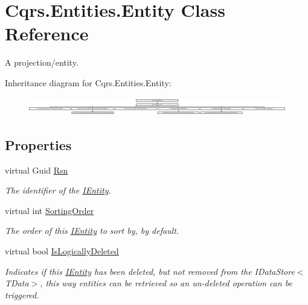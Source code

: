 \hypertarget{classCqrs_1_1Entities_1_1Entity}{}\section{Cqrs.\+Entities.\+Entity Class Reference}
\label{classCqrs_1_1Entities_1_1Entity}


A projection/entity.  


Inheritance diagram for Cqrs.\+Entities.\+Entity\+:\begin{figure}[H]
\begin{center}
\leavevmode
\includegraphics[height=0.801144cm]{classCqrs_1_1Entities_1_1Entity}
\end{center}
\end{figure}
\subsection*{Properties}
\begin{DoxyCompactItemize}
\item 
virtual Guid \hyperlink{classCqrs_1_1Entities_1_1Entity_a5c7605c4ab598f2975b914db7a274796_a5c7605c4ab598f2975b914db7a274796}{Rsn}
\begin{DoxyCompactList}\small\item\em The identifier of the \hyperlink{interfaceCqrs_1_1Entities_1_1IEntity}{I\+Entity}. \end{DoxyCompactList}\item 
virtual int \hyperlink{classCqrs_1_1Entities_1_1Entity_a9913174d2d333a505af68a0f7e5fd2ca_a9913174d2d333a505af68a0f7e5fd2ca}{Sorting\+Order}
\begin{DoxyCompactList}\small\item\em The order of this \hyperlink{interfaceCqrs_1_1Entities_1_1IEntity}{I\+Entity} to sort by, by default. \end{DoxyCompactList}\item 
virtual bool \hyperlink{classCqrs_1_1Entities_1_1Entity_a0d7379f43369a62bfe5783005d3e6ceb_a0d7379f43369a62bfe5783005d3e6ceb}{Is\+Logically\+Deleted}
\begin{DoxyCompactList}\small\item\em Indicates if this \hyperlink{interfaceCqrs_1_1Entities_1_1IEntity}{I\+Entity} has been deleted, but not removed from the I\+Data\+Store$<$\+T\+Data$>$, this way entities can be retrieved so an un-\/deleted operation can be triggered. \end{DoxyCompactList}\end{DoxyCompactItemize}


